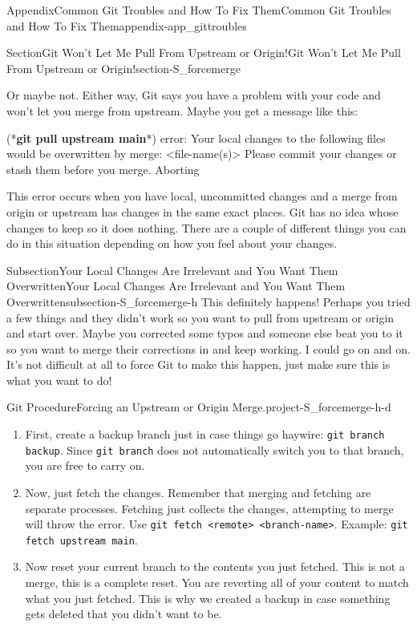 \documentclass[twoside,10pt,]{book}
\newcommand{\mono}[1]{\texttt{#1}}
\newcommand{\consoleinput}[1]{\textbf{#1}}
\begin{document}
\begin{appendixptx}{Appendix}{Common Git Troubles and How To Fix Them}{}{Common Git Troubles and How To Fix Them}{}{}{appendix-app_gittroubles}
\begin{sectionptx}{Section}{Git Won't Let Me Pull From Upstream or Origin!}{}{Git Won't Let Me Pull From Upstream or Origin!}{}{}{section-S_forcemerge}
\begin{introduction}{}
\par
Or maybe not. Either way, Git says you have a problem with your code and won't let you merge from upstream. Maybe you get a message like this:%
\begin{console}{0}{1}{0}
(*\consoleinput{git pull upstream main}*)
error: Your local changes to the following files would be overwritten by merge:
        <file-name(s)>
Please commit your changes or stash them before you merge.
Aborting
\end{console}
This error occurs when you have local, uncommitted changes and a merge from origin or upstream has changes in the same exact places. Git has no idea whose changes to keep so it does nothing. There are a couple of different things you can do in this situation depending on how you feel about your changes.%
\end{introduction}%
%
%
\typeout{************************************************}
\typeout{************************************************}
%
\begin{subsectionptx}{Subsection}{Your Local Changes Are Irrelevant and You Want Them Overwritten}{}{Your Local Changes Are Irrelevant and You Want Them Overwritten}{}{}{subsection-S_forcemerge-h}
%
This definitely happens! Perhaps you tried a few things and they didn't work so you want to pull from upstream or origin and start over. Maybe you corrected some typos and someone else beat you to it so you want to merge their corrections in and keep working. I could go on and on. It's not difficult at all to force Git to make this happen, just make sure this is what you want to do!%
\begin{project}{Git Procedure}{Forcing an Upstream or Origin Merge.}{project-S_forcemerge-h-d}%
\begin{enumerate}[font=\bfseries,label=(\alph*),ref=\alph*]%
\item{}First, create a backup branch just in case things go haywire: \mono{git branch backup}. Since \mono{git branch} does not automatically switch you to that branch, you are free to carry on.%
\item{}Now, just fetch the changes. Remember that merging and fetching are separate processes. Fetching just collects the changes, attempting to merge will throw the error. Use \mono{git fetch <remote> <branch-name>}. Example: \mono{git fetch upstream main}.%
\item{}Now reset your current branch to the contents you just fetched. This is not a merge, this is a complete reset. You are reverting all of your content to match what you just fetched. This is why we created a backup in case something gets deleted that you didn't want to be.%

\end{enumerate}
\end{project}
\end{subsectionptx}
\end{sectionptx}
\end{appendixptx}
\end{document}
